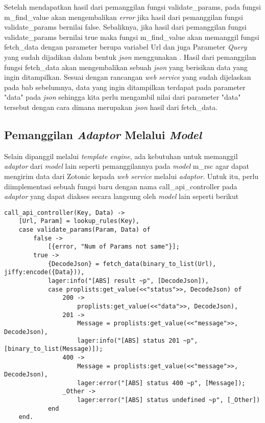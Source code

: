 Setelah mendapatkan hasil dari pemanggilan fungsi validate\_params, pada fungsi m\_find\_value akan mengembalikan \textit{error} jika hasil dari pemanggilan fungsi validate\_params bernilai false. Sebaliknya, jika hasil dari pemanggilan fungsi validate\_params bernilai true maka fungsi m\_find\_value akan memanggil fungsi fetch\_data dengan parameter berupa variabel Url dan juga Parameter \textit{Query} yang sudah dijadikan dalam bentuk \textit{json} menggunakan . Hasil dari pemanggilan fungsi fetch\_data akan mengembalikan sebuah \textit{json} yang berisikan data yang ingin ditampilkan. Sesuai dengan rancangan \textit{web service} yang sudah dijelaskan pada bab sebelumnya, data yang ingin ditampilkan terdapat pada parameter "data" pada \textit{json} sehingga kita perlu mengambil nilai dari parameter "data" tersebut dengan cara  dimana  merupakan \textit{json} hasil dari fetch\_data.

\subsection{Pemanggilan \textit{Adaptor} Melalui \textit{Model}}

Selain dipanggil melalui \textit{template engine}, ada kebutuhan untuk memanggil \textit{adaptor} dari \textit{model} lain seperti pemanggilannya pada \textit{model} m\_rsc agar dapat mengirim data dari Zotonic kepada \textit{web service} melalui \textit{adaptor}. Untuk itu, perlu diimplementasi sebuah fungsi baru dengan nama call\_api\_controller pada \textit{adaptor} yang dapat diakses secara langsung oleh \textit{model} lain seperti berikut

\begin{minipage}{\linewidth}
\begin{lstlisting}[caption={Implementasi fungsi untuk pemanggilan \textit{adaptor} dari \textit{model}},label={lst:adaptormodel}]
call_api_controller(Key, Data) ->
	[Url, Param] = lookup_rules(Key),
	case validate_params(Param, Data) of
		false ->
			[{error, "Num of Params not same"}];
		true ->
			{DecodeJson} = fetch_data(binary_to_list(Url), jiffy:encode({Data})),
			lager:info("[ABS] result ~p", [DecodeJson]),
			case proplists:get_value(<<"status">>, DecodeJson) of
				200 ->
					proplists:get_value(<<"data">>, DecodeJson),
				201 ->
					Message = proplists:get_value(<<"message">>, DecodeJson),
					lager:info("[ABS] status 201 ~p", [binary_to_list(Message)]);
				400 ->
					Message = proplists:get_value(<<"message">>, DecodeJson),
					lager:error("[ABS] status 400 ~p", [Message]);
				_Other -> 
					lager:error("[ABS] status undefined ~p", [_Other])
			end  
	end.
\end{lstlisting}
\end{minipage}

